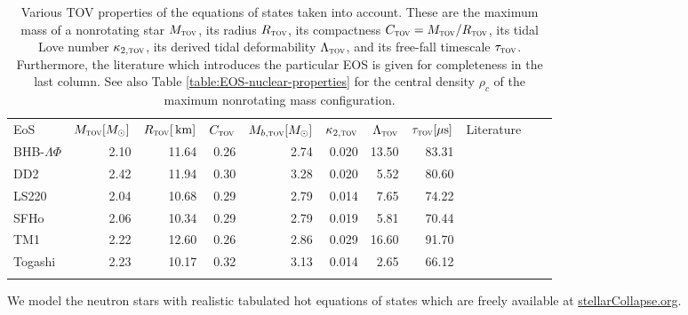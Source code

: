 \begin{table*}[b]
	\caption[
	  TOV maximum mass properties (mass, radius, compactness, baryon mass, 
	  tidal Love number, deformability, lifetime, literature reference)
	]{Various TOV properties of the equations of states taken into 
		account.
		These are the maximum mass of a nonrotating star $M_{\textsc{tov}}$, its radius 
		$R_{\textsc{tov}}$, its compactness $C_{\textsc{tov}} = M_{\textsc{tov}} / R_{\textsc{tov}}$, its tidal Love
		number $\kappa_{2,\textsc{tov}}$, its derived tidal deformability 
		$\Lambda_{\textsc{tov}}$, and its free-fall timescale $\tau_{\textsc{tov}}$. Furthermore,
		the literature which introduces the particular EOS is given for
		completeness in the last column. See also Table 
		\protect\ref{table:EOS-nuclear-properties} for the central density 
		$\rho_c$
		of the maximum nonrotating mass configuration.
	}\vspace*{.2cm}\label{table:eos-properties}%
	\begin{tabularx}{\textwidth}{Xrrrrrrrrrr}
		\toprule
		EoS               & $M_{\textsc{tov}} [M_{\odot}]$ & $R_{\textsc{tov}} [\,{\mathrm{km}}]$ & $C_{\textsc{tov}}$ & 
		$M_{b,\textsc{tov}} [M_{\odot}]$
		& $\kappa_{2,\textsc{tov}}$ & $\Lambda_{\textsc{tov}}$ & 
		$\tau_{\textsc{tov}} [\mu \rm s]$  & Literature  \\
		\colrule
		BHB-$\Lambda\Phi$ &           2.10 &        11.64 &  0.26 & 2.74 & 
		0.020 
		&  13.50 & 83.31 
		& \cite{Banik2014} \\
		DD2               &           2.42 &        11.94 &  0.30 & 3.28 & 
		0.020 &   
		5.52 & 80.60 
		& \cite{Bildsten92,Hempel2010} \\
		LS220             &           2.04 &        10.68 &  0.29 & 2.79 & 
		0.014 
		&   7.65 & 74.22
		& \cite{Lalazissis1996} \\
		SFHo              &           2.06 &        10.34 &  0.29 & 2.79 & 
		0.019 &   5.81 & 70.44
		& \cite{shen98} \\
		TM1               &           2.22 &        12.60 &  0.26 & 2.86 & 
		0.029 &  
		16.60 & 91.70
		& \cite{Lattimer91,Typel2010} \\
		Togashi           &           2.23 &        10.17 &  0.32 & 3.13 & 
		0.014 &  2.65 & 66.12 
		& \cite{Togashi2016,Togashi2017} \\
		\botrule
	\end{tabularx}
\end{table*}%
%
We model the neutron stars with realistic tabulated hot equations of states 
which are
freely available at \href{http://stellarCollapse.org}{stellarCollapse.org}.
